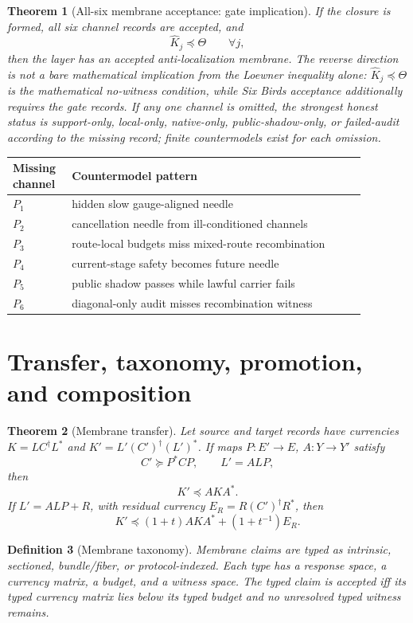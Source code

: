 \documentclass[11pt]{article}
\newtheorem{theorem}{Theorem}[section]
\newtheorem{definition}[theorem]{Definition}
\begin{document}
\begin{theorem}[All-six membrane acceptance: gate implication]
If the closure is formed, all six channel records are accepted, and
\[
  \widehat K_j\preceq\Theta\qquad\forall j,
\]
then the layer has an accepted anti-localization membrane.  The reverse direction is not a bare mathematical implication from the Loewner inequality alone: \(\widehat K_j\preceq\Theta\) is the mathematical no-witness condition, while Six Birds acceptance additionally requires the gate records.  If any one channel is omitted, the strongest honest status is support-only, local-only, native-only, public-shadow-only, or failed-audit according to the missing record; finite countermodels exist for each omission.
\end{theorem}

\begin{longtable}{p{0.13\linewidth}p{0.75\linewidth}}
\toprule
Missing channel & Countermodel pattern\\
\midrule
\(P_1\) & hidden slow gauge-aligned needle\\
\(P_2\) & cancellation needle from ill-conditioned channels\\
\(P_3\) & route-local budgets miss mixed-route recombination\\
\(P_4\) & current-stage safety becomes future needle\\
\(P_5\) & public shadow passes while lawful carrier fails\\
\(P_6\) & diagonal-only audit misses recombination witness\\
\bottomrule
\end{longtable}

\section{Transfer, taxonomy, promotion, and composition}

\begin{theorem}[Membrane transfer]
Let source and target records have currencies \(K=LC^\dagger L^*\) and \(K'=L'(C')^\dagger(L')^*\).  If maps \(P:E'\to E\), \(A:Y\to Y'\) satisfy
\[
  C'\succeq P^*CP,
  \qquad L'=ALP,
\]
then
\[
  K'\preceq AKA^*.
\]
If \(L'=ALP+R\), with residual currency \(E_R=R(C')^\dagger R^*\), then
\[
  K'\preceq(1+t)AKA^*+(1+t^{-1})E_R.
\]
\end{theorem}

\begin{definition}[Membrane taxonomy]
Membrane claims are typed as intrinsic, sectioned, bundle/fiber, or protocol-indexed.  Each type has a response space, a currency matrix, a budget, and a witness space.  The typed claim is accepted iff its typed currency matrix lies below its typed budget and no unresolved typed witness remains.
\end{definition}
\end{document}
